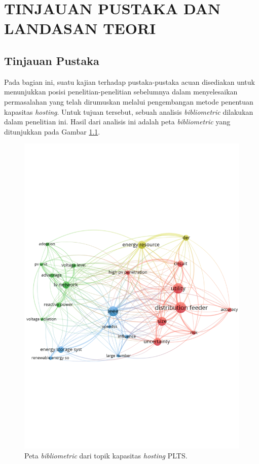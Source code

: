 \chapter{TINJAUAN PUSTAKA DAN LANDASAN TEORI}
\label{bab-tinjauan}
\section{Tinjauan Pustaka}
Pada bagian ini, suatu kajian terhadap pustaka-pustaka acuan disediakan untuk menunjukkan posisi penelitian-penelitian sebelumnya dalam menyelesaikan permasalahan yang telah dirumuskan melalui pengembangan metode penentuan kapasitas \textit{hosting}. Untuk tujuan tersebut, sebuah analisis \textit{bibliometric} dilakukan dalam penelitian ini. Hasil dari analisis ini adalah peta \textit{bibliometric} yang ditunjukkan pada Gambar \ref{biblio}. 
\begin{figure}[!h]
	\centering
	\includegraphics[width=1\textwidth]{Fig/biblio}
	\caption{Peta \textit{bibliometric} dari topik kapasitas \textit{hosting} PLTS.}
	\label{biblio}
\end{figure}
